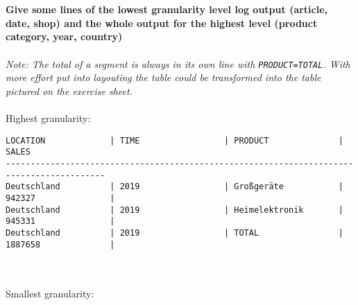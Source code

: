 \documentclass[a4paper,english,abstract=on]{scrartcl}
\begin{document}
~\\~\\
\textbf{Give some lines of the lowest granularity level log output (article, date, shop) and the whole output for the highest level (product category, year, country)}
~\\~\\
\textit{Note: The total of a segment is always in its own line with \texttt{PRODUCT=TOTAL}. With more effort put into layouting the table could be transformed into the table pictured on the exercise sheet.}
~\\~\\
Highest granularity:
\begin{lstlisting}
LOCATION             | TIME                 | PRODUCT              | SALES               
------------------------------------------------------------------------------------------
Deutschland          | 2019                 | Großgeräte           | 942327               | 
Deutschland          | 2019                 | Heimelektronik       | 945331               | 
Deutschland          | 2019                 | TOTAL                | 1887658              | 
\end{lstlisting}
~\\~\\
Smallest granularity:
\end{document}
